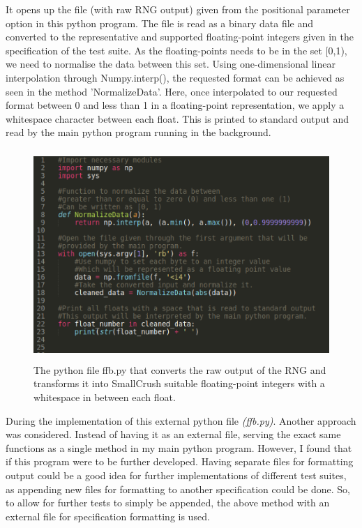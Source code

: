 \documentclass[]{final_report}
\begin{document}
\par{It opens up the file (with raw RNG output) given from the positional parameter option in this python program. The file is read as a binary data file and converted to the representative and supported floating-point integers given in the specification of the test suite. As the floating-points needs to be in the set [0,1), we need to normalise the data between this set. Using one-dimensional linear interpolation through Numpy.interp(), the requested format can be achieved as seen in the method 'NormalizeData'. Here, once interpolated to our requested format between 0 and less than 1 in a floating-point representation, we apply a whitespace character between each float. This is printed to standard output and read by the main python program running in the background.}

\begin{figure}[h!]
\begin{center}
\includegraphics[height=8cm]{code_cutout_ffb}
\caption{The python file ffb.py that converts the raw output of the RNG and transforms it into SmallCrush suitable floating-point integers with a whitespace in between each float.}
\label{fig:code_cutout_ffb}
\end{center}
\end{figure}

\par{During the implementation of this external python file \textit{(ffb.py)}. Another approach was considered. Instead of having it as an external file, serving the exact same functions as a single method in my main python program. However, I found that if this program were to be further developed. Having separate files for formatting output could be a good idea for further implementations of different test suites, as appending new files for formatting to another specification could be done. So, to allow for further tests to simply be appended, the above method with an external file for specification formatting is used.}
\end{document}
